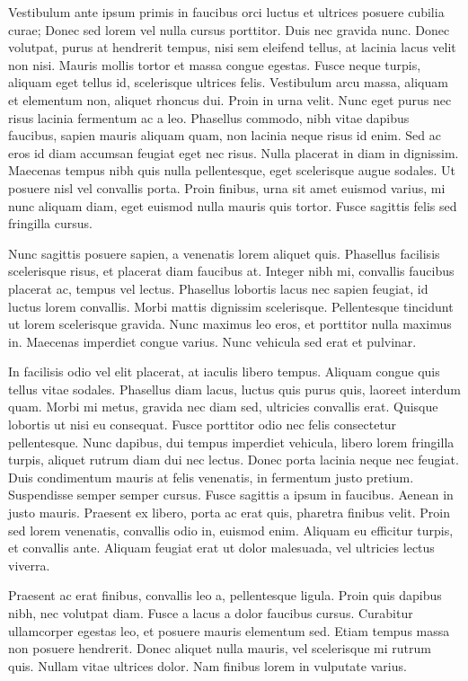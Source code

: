 Vestibulum ante ipsum primis in faucibus orci luctus et ultrices posuere
cubilia curae; Donec sed lorem vel nulla cursus porttitor. Duis nec gravida
nunc. Donec volutpat, purus at hendrerit tempus, nisi sem eleifend tellus, at
lacinia lacus velit non nisi. Mauris mollis tortor et massa congue egestas.
Fusce neque turpis, aliquam eget tellus id, scelerisque ultrices felis.
Vestibulum arcu massa, aliquam et elementum non, aliquet rhoncus dui. Proin in
urna velit. Nunc eget purus nec risus lacinia fermentum ac a leo. Phasellus
commodo, nibh vitae dapibus faucibus, sapien mauris aliquam quam, non lacinia
neque risus id enim. Sed ac eros id diam accumsan feugiat eget nec risus. Nulla
placerat in diam in dignissim. Maecenas tempus nibh quis nulla pellentesque,
eget scelerisque augue sodales. Ut posuere nisl vel convallis porta. Proin
finibus, urna sit amet euismod varius, mi nunc aliquam diam, eget euismod nulla
mauris quis tortor. Fusce sagittis felis sed fringilla cursus.

Nunc sagittis posuere sapien, a venenatis lorem aliquet quis. Phasellus
facilisis scelerisque risus, et placerat diam faucibus at. Integer nibh mi,
convallis faucibus placerat ac, tempus vel lectus. Phasellus lobortis lacus nec
sapien feugiat, id luctus lorem convallis. Morbi mattis dignissim scelerisque.
Pellentesque tincidunt ut lorem scelerisque gravida. Nunc maximus leo eros, et
porttitor nulla maximus in. Maecenas imperdiet congue varius. Nunc vehicula sed
erat et pulvinar.

In facilisis odio vel elit placerat, at iaculis libero tempus. Aliquam congue
quis tellus vitae sodales. Phasellus diam lacus, luctus quis purus quis,
laoreet interdum quam. Morbi mi metus, gravida nec diam sed, ultricies
convallis erat. Quisque lobortis ut nisi eu consequat. Fusce porttitor odio nec
felis consectetur pellentesque. Nunc dapibus, dui tempus imperdiet vehicula,
libero lorem fringilla turpis, aliquet rutrum diam dui nec lectus. Donec porta
lacinia neque nec feugiat. Duis condimentum mauris at felis venenatis, in
fermentum justo pretium. Suspendisse semper semper cursus. Fusce sagittis a
ipsum in faucibus. Aenean in justo mauris. Praesent ex libero, porta ac erat
quis, pharetra finibus velit. Proin sed lorem venenatis, convallis odio in,
euismod enim. Aliquam eu efficitur turpis, et convallis ante. Aliquam feugiat
erat ut dolor malesuada, vel ultricies lectus viverra.

Praesent ac erat finibus, convallis leo a, pellentesque ligula. Proin quis
dapibus nibh, nec volutpat diam. Fusce a lacus a dolor faucibus cursus.
Curabitur ullamcorper egestas leo, et posuere mauris elementum sed. Etiam
tempus massa non posuere hendrerit. Donec aliquet nulla mauris, vel scelerisque
mi rutrum quis. Nullam vitae ultrices dolor. Nam finibus lorem in vulputate
varius.

